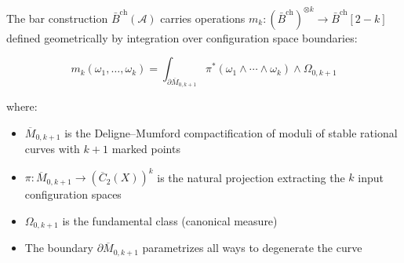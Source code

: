\begin{theorem}\label{thm:ainfty-moduli}
The bar construction $\bar{B}^{\text{ch}}(\mathcal{A})$ carries operations
$m_k: (\bar{B}^{\text{ch}})^{\otimes k} \to \bar{B}^{\text{ch}}[2-k]$ defined
geometrically by integration over configuration space boundaries:

\[m_k(\omega_1, \ldots, \omega_k) = \int_{\partial \overline{M}_{0,k+1}}
\pi^*(\omega_1 \wedge \cdots \wedge \omega_k) \wedge \Omega_{0,k+1}\]

where:
\begin{itemize}
\item $\overline{M}_{0,k+1}$ is the Deligne--Mumford compactification of moduli
of stable rational curves with $k+1$ marked points
\item $\pi: \overline{M}_{0,k+1} \to (\overline{C}_2(X))^k$ is the natural
projection extracting the $k$ input configuration spaces
\item $\Omega_{0,k+1}$ is the fundamental class (canonical measure)
\item The boundary $\partial \overline{M}_{0,k+1}$ parametrizes all ways to
degenerate the curve
\end{itemize}
\end{theorem}

